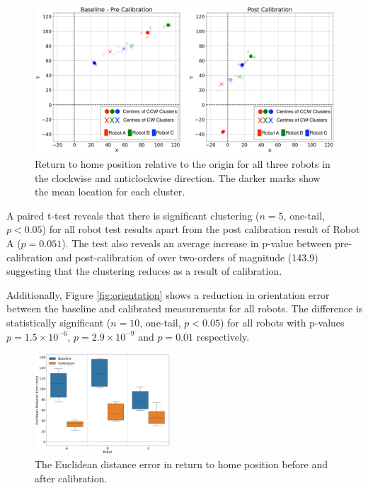 \documentclass[conference]{IEEEtran}
\begin{document}
\begin{figure}[h!]
    \centering
    \includegraphics[width=.9\textwidth]{img/xy_pre_post_2.png}
    \caption{Return to home position relative to the origin for all three robots in the clockwise and anticlockwise direction. The darker marks show the mean location for each cluster.}
    \label{fig:xy_scatter}
\end{figure}

A paired t-test reveals that there is significant clustering ($n = 5$, one-tail, $p < 0.05$) for all robot test results apart from the post calibration result of Robot A ($p=0.051$). The test also reveals an average increase in p-value between pre-calibration and post-calibration of over two-orders of magnitude (143.9) suggesting that the clustering reduces as a result of calibration. 


Additionally, Figure \ref{fig:orientation} shows a reduction in orientation error between the baseline and calibrated measurements for all robots. The difference is statistically significant ($n = 10$, one-tail, $p < 0.05$) for all robots with p-values $p=1.5\times10^{-6}$, $p=2.9\times10^{-9}$ and $p=0.01$ respectively. 



\begin{figure}[h!]
    \centering
    \includegraphics[width = 0.45\textwidth]{img/xy_error_boxplot.png}
    \caption{The Euclidean distance error in return to home position before and after calibration.}
    \label{fig:xy_box}
\end{figure}
\end{document}
